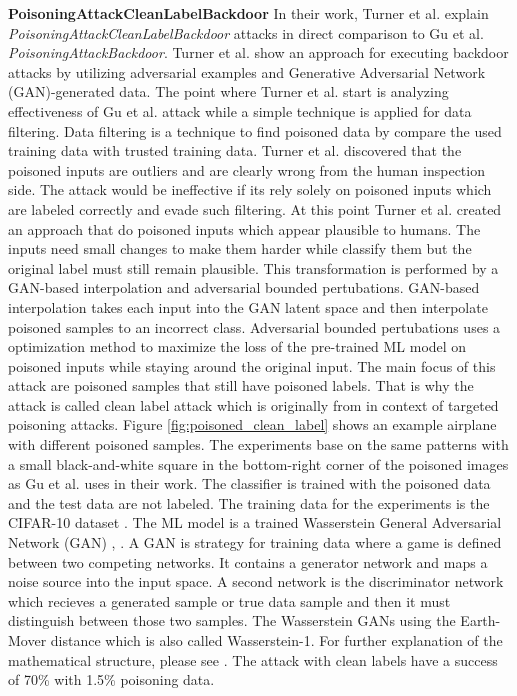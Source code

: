 \textbf{PoisoningAttackCleanLabelBackdoor} In their work, Turner et al. \cite{turner2018clean} explain \textit{PoisoningAttackCleanLabelBackdoor} attacks in direct comparison to Gu et al. \textit{PoisoningAttackBackdoor}. Turner et al. show an approach for executing backdoor attacks by utilizing adversarial examples and Generative Adversarial Network (GAN)-generated data. The point where Turner et al. start is analyzing effectiveness of Gu et al. attack while a simple technique is applied for data filtering. Data filtering is a technique to find poisoned data by compare the used training data with trusted training data. Turner et al. discovered that the poisoned inputs are outliers and are clearly wrong from the human inspection side. The attack would be ineffective if its rely solely on poisoned inputs which are labeled correctly and evade such filtering. At this point Turner et al. created an approach that do poisoned inputs which appear plausible to humans. The inputs need small changes to make them harder while classify them but the original label must still remain plausible. This transformation is performed by a GAN-based interpolation and adversarial bounded pertubations. GAN-based interpolation takes each input into the GAN latent space \cite{DBLP:conf/nips/GoodfellowPMXWOCB14} and then interpolate poisoned samples to an incorrect class. Adversarial bounded pertubations uses a optimization method to maximize the loss of the pre-trained ML model on poisoned inputs while staying around the original input. The main focus of this attack are poisoned samples that still have poisoned labels. That is why the attack is called clean label attack which is originally from \cite{DBLP:journals/corr/abs-1804-00792} in context of targeted poisoning attacks. Figure \ref{fig:poisoned_clean_label} shows an example airplane with different poisoned samples. The experiments base on the same patterns with a small black-and-white square in the bottom-right corner of the poisoned images as Gu et al. uses in their work. The classifier is trained with the poisoned data and the test data are not labeled. The training data for the experiments is the CIFAR-10 dataset \cite{Krizhevsky2009LearningML}. The ML model is a trained Wasserstein General Adversarial Network (GAN) \cite{DBLP:journals/corr/ArjovskyCB17}, \cite{DBLP:conf/nips/GulrajaniAADC17}. A GAN is strategy for training data where a game is defined between two competing networks. It contains a generator network and maps a noise source into the input space. A second network is the discriminator network which recieves a generated sample or true data sample and then it must distinguish between those two samples. The Wasserstein GANs using the Earth-Mover distance which is also called Wasserstein-1. For
further explanation of the mathematical structure, please see \cite{DBLP:journals/corr/GulrajaniAADC17}. The attack with clean labels have a success of 70\% with 1.5\% poisoning data.

